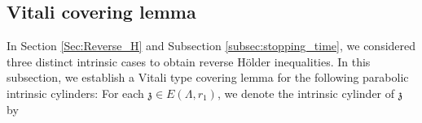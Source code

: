 \documentclass[11pt,oneside, english,reqno,twoside a4paper]{amsart}
\theoremstyle{definition}
\numberwithin{theorem}{section}
\numberwithin{equation}{section}
\newcommand{\la}{\lambda}
\begin{document}





\subsection{Vitali covering lemma}\label{subsec:Vitali}

In Section \ref{Sec:Reverse_H} and Subsection \ref{subsec:stopping_time}, we considered three distinct intrinsic cases to obtain reverse H\"{o}lder inequalities.
In this subsection, we establish a Vitali type covering lemma for the following parabolic intrinsic cylinders: For each $\mathfrak{z}\in E(\Lambda,r_1)$, we denote the intrinsic cylinder of $\mathfrak{z}$ by
\end{document}

